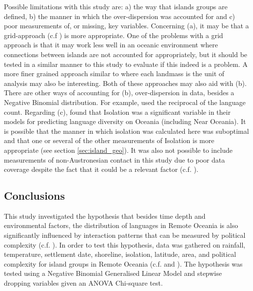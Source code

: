 \documentclass[a4paper,10pt]{article} %
\begin{document}
Possible limitations with this study are: a) the way that islands groups are defined, b) the manner in which the over-dispersion was accounted for and c) poor measurements of, or missing, key variables. Concerning (a), it may be that a grid-approach (c.f \citet{hua2019ecological}) is more appropriate. One of the problems with a grid approach is that it may work less well in an oceanic environment where connections between islands are not accounted for appropriately, but it should be tested in a similar manner to this study to evaluate if this indeed is a problem. A more finer grained approach similar to  \citet{gavin2012island} where each landmass is the unit of analysis may also be interesting. Both of these approaches may also aid with (b). There are other ways of accounting for (b), over-dispersion in data, besides a Negative Binomial distribution. For example, \citet[4-5]{gavin2012island} used the reciprocal of the language count. Regarding (c), \citet[4-5]{gavin2012island} found that Isolation was a significant variable in their models for predicting language diversity on Oceania (including Near Oceania). It is possible that the manner in which isolation was calculated here was suboptimal and that one or several of the other measurements of Isolation is more appropriate (see section \ref{sec:island_geo}). It was also not possible to include measurements of non-Austronesian contact in this study due to poor data coverage despite the fact that it could be a relevant factor (c.f. \citet{lipson_harvad_ancient_dna_vanuatu_2018, posth_jena_ancient_dna_vanuatu_2018}). 
 


\subsection{Conclusions}
This study investigated the hypothesis that besides time depth and environmental factors, the distribution of languages in Remote Oceania is also significantly influenced by interaction patterns that can be measured by political complexity (c.f. \citet{pawley81, pawley2007}). In order to test this hypothesis, data was gathered on rainfall, temperature, settlement date, shoreline, isolation, latitude, area, and political complexity for island groups in Remote Oceania (c.f. \citet{curriemace2009, gavin2012island, hua2019ecological} and \citet{Pacheco_Coelho_2019}). The hypothesis was tested using a Negative Binomial Generalised Linear Model and stepwise dropping variables given an ANOVA Chi-square test.
\end{document}
